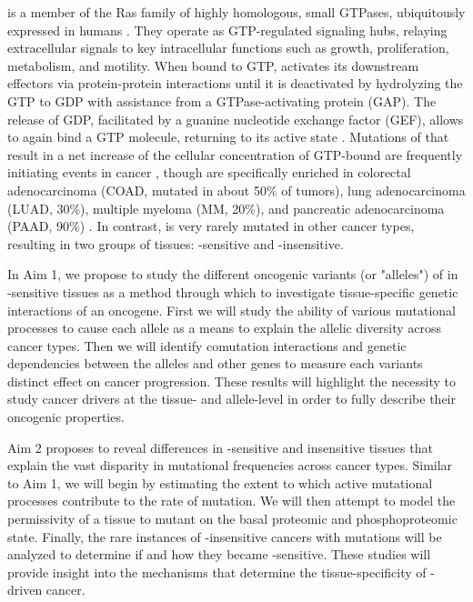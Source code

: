 \kras{} is a member of the Ras family of highly homologous, small GTPases, ubiquitously expressed in humans \cite{Barbacid1987, Prior2012}. 
They operate as GTP-regulated signaling hubs, relaying extracellular signals to key intracellular functions such as growth, proliferation, metabolism, and motility. 
When bound to GTP, \kras{} activates its downstream effectors via protein-protein interactions until it is deactivated by hydrolyzing the GTP to GDP with assistance from a GTPase-activating protein (GAP). The release of GDP, facilitated by a guanine nucleotide exchange factor (GEF), allows \kras{} to again bind a GTP molecule, returning to its active state \cite{Barbacid1987, Johnson2017}. Mutations of \KRAS{} that result in a net increase of the cellular concentration of GTP-bound \kras{} are frequently initiating events in cancer \cite{Kanda2012, Zhang2014a, Li2018}, though are specifically enriched in colorectal adenocarcinoma (COAD, mutated in about 50\% of tumors), lung adenocarcinoma (LUAD, 30\%), multiple myeloma (MM, 20\%), and pancreatic adenocarcinoma (PAAD, 90\%) \cite{Prior2020TheCancer}.
In contrast, \KRAS{} is very rarely mutated in other cancer types, resulting in two groups of tissues: \KRAS{}-sensitive and \KRAS{}-insensitive.

In Aim 1, we propose to study the different oncogenic variants (or "alleles") of \KRAS{} in \KRAS{}-sensitive tissues as a method through which to investigate tissue-specific genetic interactions of an oncogene.
First we will study the ability of various mutational processes to cause each allele as a means to explain the allelic diversity across cancer types.
Then we will identify comutation interactions and genetic dependencies between the \KRAS{} alleles and other genes to measure each variants distinct effect on cancer progression.
These results will highlight the necessity to study cancer drivers at the tissue- and allele-level in order to fully describe their oncogenic properties.

Aim 2 proposes to reveal differences in \KRAS{}-sensitive and insensitive tissues that explain the vast disparity in mutational frequencies across cancer types.
Similar to Aim 1, we will begin by estimating the extent to which active mutational processes contribute to the rate of \KRAS{} mutation.
We will then attempt to model the permissivity of a tissue to mutant \KRAS{} on the basal proteomic and phosphoproteomic state.
Finally, the rare instances of \KRAS{}-insensitive cancers with \KRAS{} mutations will be analyzed to determine if and how they became \KRAS{}-sensitive.
These studies will provide insight into the mechanisms that determine the tissue-specificity of \KRAS{}-driven cancer.


